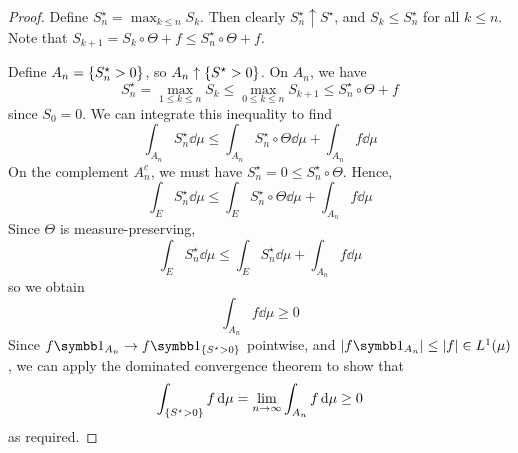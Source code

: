 \begin{proof}
    Define \( S_n^\star = \max_{k \leq n} S_k \).
    Then clearly \( S_n^\star \uparrow S^\star \), and \( S_k \leq S_n^\star \) for all \( k \leq n \).
    Note that \( S_{k+1} = S_k \circ \Theta + f \leq S_n^\star \circ \Theta + f \).

    Define \( A_n = \qty{S_n^\star > 0} \), so \( A_n \uparrow \qty{S^\star > 0} \).
    On \( A_n \), we have
    \[ S_n^\star = \max_{1 \leq k \leq n} S_k \leq \max_{0 \leq k \leq n} S_{k+1} \leq S_n^\star \circ \Theta + f \]
    since \( S_0 = 0 \).
    We can integrate this inequality to find
    \[ \int_{A_n} S_n^\star \dd{\mu} \leq \int_{A_n} S_n^\star \circ \Theta \dd{\mu} + \int_{A_n} f \dd{\mu} \]
    On the complement \( A_n^c \), we must have \( S_n^\star = 0 \leq S_n^\star \circ \Theta \).
    Hence,
    \[ \int_E S_n^\star \dd{\mu} \leq \int_E S_n^\star \circ \Theta \dd{\mu} + \int_{A_n} f \dd{\mu} \]
    Since \( \Theta \) is measure-preserving,
    \[ \int_E S_n^\star \dd{\mu} \leq \int_E S_n^\star \dd{\mu} + \int_{A_n} f \dd{\mu} \]
    so we obtain
    \[ \int_{A_n} f \dd{\mu} \geq 0 \]
    Since \( f \symbb 1_{A_n} \to f \symbb 1_{\qty{S^\star > 0}} \) pointwise, and \( \abs{f \symbb 1_{A_n}} \leq \abs{f} \in L^1(\mu) \), we can apply the dominated convergence theorem to show that
    \[ \int_{\qty{S^\star > 0}} f \dd{\mu} = \lim_{n \to \infty} \int_{A_n} f \dd{\mu} \geq 0 \]
    as required.
\end{proof}

